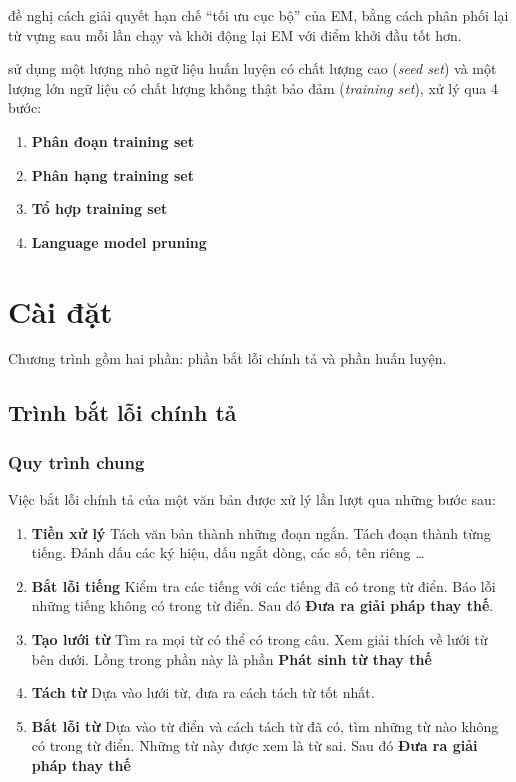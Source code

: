 \documentclass[a4paper,oneside]{book} %
\begin{document}
\cite{self-supervised} đề nghị cách giải quyết hạn chế ``tối ưu cục
bộ'' của EM, bằng cách phân phối lại từ vựng sau mỗi lần chạy và khởi
động lại EM với điểm khởi đầu tốt hơn.

\cite{text-tiling} sử dụng một lượng nhỏ ngữ liệu huấn luyện có chất
lượng cao (\textit{seed set}) và một lượng lớn ngữ liệu có chất lượng
không thật bảo đảm (\textit{training set}), xử lý qua 4 bước:
\begin{enumerate}
\item \textbf{Phân đoạn training set}
\item \textbf{Phân hạng training set}
\item \textbf{Tổ hợp training set}
\item \textbf{Language model pruning}
\end{enumerate}

\chapter{Cài đặt}
\label{cha:implementation}

Chương trình gồm hai phần: phần bắt lỗi chính tả và phần huấn luyện.

\section{Trình bắt lỗi chính tả}


\subsection{Quy trình chung}
\label{sec:spellcheck}

Việc bắt lỗi chính tả của một văn bản được xử lý lần lượt qua những
bước sau:
\begin{enumerate}
\item \textbf{Tiền xử lý} Tách văn bản thành những đoạn ngắn. Tách
  đoạn thành từng tiếng. Đánh dấu các ký hiệu, dấu ngắt dòng, các số,
  tên riêng \ldots
\item \textbf{Bắt lỗi tiếng} Kiểm tra các tiếng với các tiếng đã có
  trong từ điển. Báo lỗi những tiếng không có trong từ điển. Sau đó 
  \textbf{Đưa ra giải pháp thay thế}.
\item \textbf{Tạo lưới từ} Tìm ra mọi từ có thể có trong câu. Xem
  giải thích về lưới từ bên dưới. Lồng trong phần này là phần
  \textbf{Phát sinh từ thay thế}
\item \textbf{Tách từ} Dựa vào lưới từ, đưa ra cách tách từ tốt nhất.
\item \textbf{Bắt lỗi từ} Dựa vào từ điển và cách tách từ đã có,
  tìm những từ nào không có trong từ điển. Những từ này được xem là từ
  sai. Sau đó \textbf{Đưa ra giải pháp thay thế}
\end{enumerate}
\end{document}
